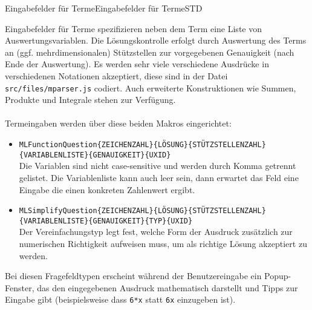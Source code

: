 \begin{MXContent}{Eingabefelder für Terme}{Eingabefelder für Terme}{STD}

\begin{MInfo}
Eingabefelder für Terme spezifizieren neben dem Term eine Liste von Auswertungsvariablen. Die Lösungskontrolle erfolgt durch Auswertung des Terms an (ggf. mehrdimensionalen) Stützstellen
zur vorgegebenen Genauigkeit (nach Ende der Auswertung). Es werden sehr viele verschiedene Ausdrücke in verschiedenen Notationen akzeptiert, diese sind in der Datei \texttt{src/files/mparser.js}
codiert. Auch erweiterte Konstruktionen wie Summen, Produkte und Integrale stehen zur Verfügung.
\ \\ \ \\
Termeingaben werden über diese beiden Makros eingerichtet:
\begin{itemize}
\item{\texttt{MLFunctionQuestion\{ZEICHENZAHL\}\{LÖSUNG\}\{STÜTZSTELLENZAHL\}\{VARIABLENLISTE\}\{GENAUIGKEIT\}\{UXID\}}\\
Die Variablen sind nicht case-sensitive und werden durch Komma getrennt gelistet. Die Variablenliste kann auch leer sein, dann erwartet das Feld eine Eingabe die einen konkreten Zahlenwert
ergibt.}
\item{\texttt{MLSimplifyQuestion\{ZEICHENZAHL\}\{LÖSUNG\}\{STÜTZSTELLENZAHL\}\{VARIABLENLISTE\}\{GENAUIGKEIT\}\{TYP\}\{UXID\}}\\
Der Vereinfachungstyp legt fest, welche Form der Ausdruck zusätzlich zur numerischen Richtigkeit aufweisen muss, um als richtige Lösung akzeptiert zu werden.}
\end{itemize}
Bei diesen Fragefeldtypen erscheint während der Benutzereingabe ein Popup-Fenster, das den eingegebenen Ausdruck mathematisch darstellt und
Tipps zur Eingabe gibt (beispielsweise dass \texttt{6*x} statt \texttt{6x} einzugeben ist).
\end{MInfo}


\end{MXContent}
